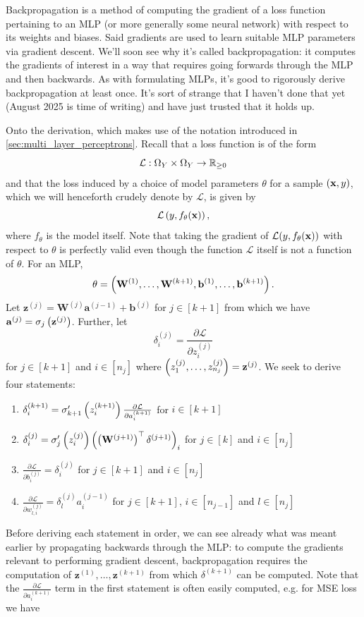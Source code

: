 \documentclass[11pt]{article}
\begin{document}
Backpropagation is a method of computing the gradient of a loss function pertaining to an MLP (or more generally some neural network) with respect to its weights and biases. Said gradients are used to learn suitable MLP parameters via gradient descent. We'll soon see why it's called backpropagation: it computes the gradients of interest in a way that requires going forwards through the MLP and then backwards. As with formulating MLPs, it's good to rigorously derive backpropagation at least once. It's sort of strange that I haven't done that yet (August 2025 is time of writing) and have just trusted that it holds up.

Onto the derivation, which makes use of the notation introduced in \autoref{sec:multi_layer_perceptrons}. Recall that a loss function is of the form
$$
\mathcal{L}:\Omega_{Y}\times\Omega_{Y}\to\mathbb{R}_{\geq0}
$$
and that the loss induced by a choice of model parameters $\theta$ for a sample $(\mathbf{x},y)$, which we will henceforth crudely denote by $\mathcal{L}$, is given by
$$
\mathcal{L}\left(y,f_{\theta}(\mathbf{x})\right),
$$
where $f_{\theta}$ is the model itself. Note that taking the gradient of $\mathcal{L}(y,f_{\theta}(\mathbf{x}))$ with respect to $\theta$ is perfectly valid even though the function $\mathcal{L}$ itself is not a function of $\theta$. For an MLP,
$$
\theta
=
\left(\mathbf{W}^{(1)},\dots,\mathbf{W}^{(k+1)},\mathbf{b}^{(1)},\dots,\mathbf{b}^{(k+1)}\right).
$$
Let $\mathbf{z}^{(j)}=\mathbf{W}^{(j)}\mathbf{a}^{(j-1)}+\mathbf{b}^{(j)}$ for $j\in[k+1]$ from which we have $\mathbf{a}^{(j)}=\sigma_{j}\left(\mathbf{z}^{(j)}\right)$. Further, let
$$
\delta^{(j)}_i
=
\frac{\partial\mathcal{L}}{\partial z^{(j)}_i}
$$
for $j\in[k+1]$ and $i\in[n_j]$ where $\left(z_1^{(j)},\dots,z_{n_j}^{(j)}\right)=\mathbf{z}^{(j)}$. We seek to derive four statements:
\begin{enumerate}
    \item $\delta_i^{(k+1)}=\sigma_{k+1}'\left(z_i^{(k+1)}\right)\frac{\partial\mathcal{L}}{\partial a_i^{(k+1)}}$ for $i\in[k+1]$
    \item $\delta_i^{(j)}=\sigma_{j}'\left(z_i^{(j)}\right)\left(\left(\mathbf{W}^{(j+1)}\right)^\top\delta^{(j+1)}\right)_i$ for $j\in[k]$ and $i\in[n_j]$
    \item $\frac{\partial\mathcal{L}}{\partial b^{(j)}_i}=\delta^{(j)}_i$ for $j\in[k+1]$ and $i\in[n_j]$
    \item $\frac{\partial\mathcal{L}}{\partial w_{l,i}^{(j)}}=\delta_l^{(j)}a_i^{(j-1)}$ for $j\in[k+1]$, $i\in[n_{j-1}]$ and $l\in[n_j]$
\end{enumerate}
Before deriving each statement in order, we can see already what was meant earlier by propagating backwards through the MLP: to compute the gradients relevant to performing gradient descent, backpropagation requires the computation of $\mathbf{z}^{(1)},\dots,\mathbf{z}^{(k+1)}$ from which $\delta^{(k+1)}$ can be computed. Note that the $\frac{\partial\mathcal{L}}{\partial a_i^{(k+1)}}$ term in the first statement is often easily computed, e.g. for MSE loss we have
\end{document}
